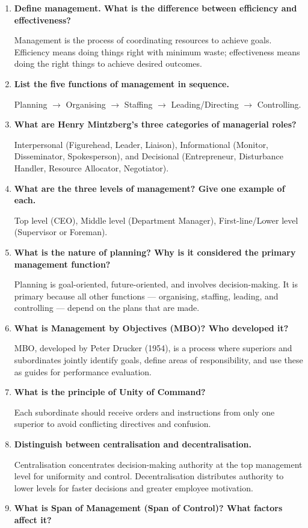 \documentclass[12pt,a4paper]{article}
\newcommand{\Q}[1]{\textbf{#1}\par\noindent\ignorespaces}
\begin{document}
\begin{tcolorbox}[exambox, title={\textbf{Frequently Asked / Viva Questions}}]
\begin{enumerate}[topsep=0pt, label=\textbf{Q\arabic*.}, itemsep=5pt]
  \item \Q{Define management. What is the difference between efficiency and effectiveness?}
    Management is the process of coordinating resources to achieve goals. Efficiency means doing things right with minimum waste; effectiveness means doing the right things to achieve desired outcomes.
  \item \Q{List the five functions of management in sequence.}
    Planning $\rightarrow$ Organising $\rightarrow$ Staffing $\rightarrow$ Leading/Directing $\rightarrow$ Controlling.
  \item \Q{What are Henry Mintzberg's three categories of managerial roles?}
    Interpersonal (Figurehead, Leader, Liaison), Informational (Monitor, Disseminator, Spokesperson), and Decisional (Entrepreneur, Disturbance Handler, Resource Allocator, Negotiator).
  \item \Q{What are the three levels of management? Give one example of each.}
    Top level (CEO), Middle level (Department Manager), First-line/Lower level (Supervisor or Foreman).
  \item \Q{What is the nature of planning? Why is it considered the primary management function?}
    Planning is goal-oriented, future-oriented, and involves decision-making. It is primary because all other functions --- organising, staffing, leading, and controlling --- depend on the plans that are made.
  \item \Q{What is Management by Objectives (MBO)? Who developed it?}
    MBO, developed by Peter Drucker (1954), is a process where superiors and subordinates jointly identify goals, define areas of responsibility, and use these as guides for performance evaluation.
  \item \Q{What is the principle of Unity of Command?}
    Each subordinate should receive orders and instructions from only one superior to avoid conflicting directives and confusion.
  \item \Q{Distinguish between centralisation and decentralisation.}
    Centralisation concentrates decision-making authority at the top management level for uniformity and control. Decentralisation distributes authority to lower levels for faster decisions and greater employee motivation.
  \item \Q{What is Span of Management (Span of Control)? What factors affect it?}

\end{enumerate}
\end{tcolorbox}
\end{document}
